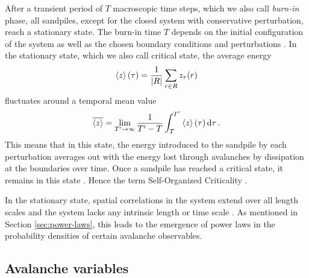 After a transient period of $T$ macroscopic time steps, which we also call \emph{burn-in} phase, all sandpiles, except for the closed system with conservative perturbation, reach a stationary state. The burn-in time $T$ depends on the initial configuration of the system as well as the chosen boundary conditions and perturbations \cite{christensen1991dynamical}. In the stationary state, which we also call critical state, the average energy
\begin{equation}
    \expval{z}(\tau) = \frac{1}{\abs{R}}\sum_{r\in R}z_\tau(r) \label{eqn:z_mean}
\end{equation}
fluctuates around a temporal mean value
\begin{equation}
    \overline{\expval{z}} = \lim_{T'\to\infty}\frac{1}{T'-T}\int_{T}^{T'}\expval{z}(\tau)\dd{\tau}.
\end{equation}
This means that in this state, the energy introduced to the sandpile by each perturbation averages out with the energy lost through avalanches by dissipation at the boundaries over time. Once a sandpile has reached a critical state, it remains in this state \cite{gros2015cellular}. Hence the term Self-Organized Criticality \cite{Dhar1990}.

In the stationary state, spatial correlations in the system extend over all length scales and the system lacks any intrinsic length or time scale \cite{pruessner2012scaling}. As mentioned in Section \ref{sec:power-laws}, this leads to the emergence of power laws in the probability densities of certain avalanche observables.

\subsection{Avalanche variables}

